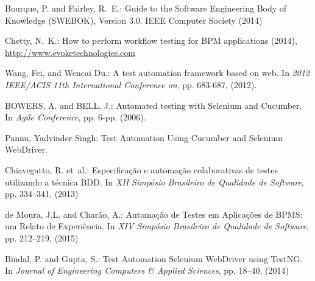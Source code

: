 \documentclass[runningheads,a4paper]{llncs}
\begin{document}
\begin{thebibliography}{4}
Bourque, P. and Fairley, R.~E.: Guide to the Software Engineering Body of Knowledge (SWEBOK), Version 3.0. IEEE Computer Society (2014)

 Chetty, N.~K.: How to perform workflow testing for BPM applications (2014), \url{http://www.evoketechnologies.com}

Wang, Fei, and Wencai Du.: A test automation framework based on web. In {\em 2012 IEEE/ACIS 11th International Conference on}, pp. 683-687, (2012).

BOWERS, A. and BELL, J.: Automated testing with Selenium and Cucumber. In {\em Agile Conference}, pp. 6-pp, (2006).

Pannu, Yadvinder Singh: Test Automation Using Cucumber and Selenium WebDriver. 

Chiavegatto, R. et~al.: Especificação e automação colaborativas de testes utilizando a técnica {BDD}. In {\em XII Simpósio Brasileiro de Qualidade de Software}, pp. 334--341, (2013)

de Moura, J.L. and Charão, A.: Automação de Testes em Aplicações de BPMS: um Relato de Experiência. In {\em XIV Simpósio Brasileiro de Qualidade de Software}, pp.
  212--219, (2015)



Bindal, P. and Gupta, S.: Test Automation Selenium WebDriver using TestNG. In {\em Journal of Engineering Computers \& Applied Sciences}, pp.
  18--40, (2014)


\end{thebibliography}
\end{document}
